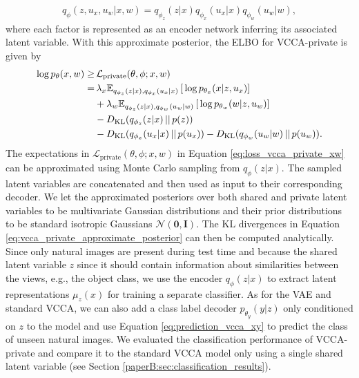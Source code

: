 \begin{align}\label{eq:vcca_private_approximate_posterior}
    q_{\phi}(z, u_{x}, u_{w} | x, w) = q_{\phi_{z}}(z | x) q_{\phi_{x}}(u_{x} | x) q_{\phi_{w}}(u_{w} | w),
\end{align}
where each factor is represented as an encoder network inferring its associated latent variable. With this approximate posterior, the ELBO for VCCA-private is given by
\begin{align}
    \begin{split} \label{eq:loss_vcca_private_xw}
        \log p_{\theta}(x, w) \geq & \, \mathcal{L}_{\text{private}}(\theta, \phi; x, w) \\ 
        = & \, \lambda_{x} \mathbb{E}_{q_{\phi_{z}}(z|x), q_{\phi_{x}}(u_{x}|x)}\left[\, \log p_{\theta_{x}}(x | z, u_{x}) \right] \\ 
        & + \lambda_{w}  \mathbb{E}_{q_{\phi_{z}}(z|x), q_{\phi_{w}}(u_{w}|w)}\left[\, \log p_{\theta_{w}}(w | z, u_{w}) \right] \\ 
        & - D_{\mathrm{KL}}(q_{\phi_{z}}(z|x)\,||\,p(z)) \\ 
        & - D_{\mathrm{KL}}(q_{\phi_{x}}(u_{x}|x)\,||\,p(u_{x})) - D_{\mathrm{KL}}(q_{\phi_{w}}(u_{w} |w)\,||\,p(u_{w})) .
    \end{split}
\end{align}
The expectations in $\mathcal{L}_{\text{private}}(\theta, \phi; x, w)$ in Equation \ref{eq:loss_vcca_private_xw} can be approximated using Monte Carlo sampling from $q_{\phi}(z | x)$. The sampled latent variables are concatenated and then used as input to their corresponding decoder. We let the approximated posteriors over both shared and private latent variables to be multivariate Gaussian distributions and their prior distributions to be standard isotropic Gaussians $\mathcal{N}(\bm{0}, \mathbf{I})$. The KL divergences in Equation \ref{eq:vcca_private_approximate_posterior} can then be computed analytically. 
Since only natural images are present during test time and because the shared latent variable $z$ since it should contain information about similarities between the views, e.g., the object class, we use the encoder $q_{\phi}(z|x)$ to extract latent representations $\mu_{z}(x)$ for training a separate classifier. As for the VAE and standard VCCA, we can also add a class label decoder $p_{\theta_{y}}(y | z)$ only conditioned on $z$ to the model and use Equation \ref{eq:prediction_vcca_xy} to predict the class of unseen natural images. We evaluated the classification performance of VCCA-private and compare it to the standard VCCA model only using a single shared latent variable (see Section \ref{paperB:sec:classification_results}). %


